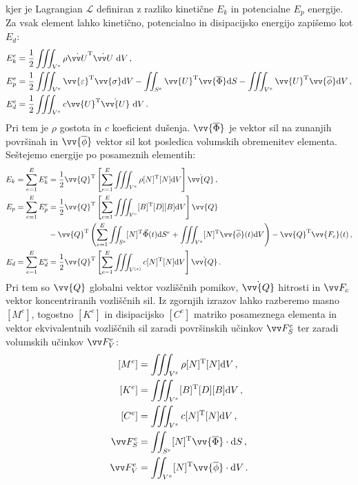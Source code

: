         kjer je Lagrangian $\mathcal{L}$ definiran z razliko kinetične $E_k$ in potencialne $E_p$ energije. Za vsak element lahko kinetično, potencialno in disipacijsko energijo zapišemo kot $E_d$:
        \begin{align}
            E_k^e&=\frac{1}{2} \iiint_{V^e} \rho \dot{\vv U}^{\text{T}} \dot{\vv U} \mathrm{~d} V \,,\\
            E_p^e&=\frac{1}{2} \iiint_{V^e} \vv{\varepsilon}^{\text{T}} \vv{\sigma} \mathrm{d} V-\iint_{S^{e}} \vv{U}^{\text{T}} \vv{\overline{\Phi}} \mathrm{d} S -\iiint_{V^e} \vv{U}^{\text{T}} \vv{\overline{\phi}} \mathrm{d} V \,,\\
            E_d^e&=\frac{1}{2} \iiint_{V^{e}} c \vv{U}^{\text{T}} \dot{\vv{U}} \mathrm{~d} V \, . 
        \end{align}
        Pri tem je $\rho$ gostota in $c$ koeficient dušenja. $\vv{\overline{\Phi}}$ je vektor sil na zunanjih površinah in $ \vv{\overline{\phi}}$ vektor sil kot posledica volumskih obremenitev  elementa. 
        Seštejemo energije po posameznih elementih:
        \begin{align}
            E_k=\sum_{e=1}^{E} E_k^{e}&=\frac{1}{2} \vv{Q}^{\text{T}}\left[\sum_{e=1}^{E} \iiint_{V^e} \rho[N]^{\text{T}}[N] \mathrm{d} V\right] \dot{\vv{Q}} \,,\\
            E_p=\sum_{e=1}^{E} E_p^{e}&=\frac{1}{2} \vv{Q}^{\text{T}}\left[\sum_{e=1}^{E} \iiint_{V^e}[B]^{\text{T}}[D][B] \mathrm{d} V\right] \vv{Q} \nonumber \\ 
            &-\vv{Q}^{\text{T}}\left(\sum_{e=1}^{E} \iint_{S^{e}}[N]^{\text{T}} \vec{\Phi}(t) \mathrm{d} S^e+\iiint_{V^e}[N]^{\text{T}} \vv{\overline{\phi}}(t) \mathrm{d} V\right)-\vv{Q}^{\text{T}} \vv{F_c}(t) \,,\\
            E_d=\sum_{e=1}^{E} E_d^{e}&=\frac{1}{2} \vv{Q}^{\text{T}}\left[\sum_{e=1}^{E} \iiint_{V^{(e)}} c[N]^{\text{T}}[N] \mathrm{d} V\right] \dot{\vv{Q}} \,.
        \end{align}
        Pri tem so $\vv{Q}$ globalni vektor vozliščnih pomikov, $\dot{\vv{Q}}$ hitrosti in $\vv F_c$ vektor koncentriranih vozliščnih sil. Iz zgornjih izrazov lahko razberemo masno $[M^e]$, togostno $[K^e]$ in disipacijsko $[C^e]$ matriko posameznega elementa in vektor ekvivalentnih vozliščnih sil zaradi površinskih učinkov $ \vv F_S^e$ ter zaradi volumskih učinkov $ \vv F_V^e$:
        \begin{align}
            \left[M^{e}\right]&=\iiint_{V^e} \rho[N]^{\text{T}}[N] \mathrm{d} V \label{eq:M_matrika} \,, \\
            \left[K^{e}\right]&=\iiint_{V^e} [B]^{\text{T}}[D][B] \mathrm{d} V \label{eq:K_matrika} \,, \\
            \left[C^{e}\right]&=\iiint_{V^e} c[N]^{\text{T}}[N] \mathrm{d} V \,, \\
            \vv F_S^e&=\iint_{S^{e}}[N]^{\text{T}} \vv{\overline{\Phi}} \cdot \mathrm{d} S \,, \\
            \vv F_V^e&=\iint_{V^{e}}[N]^{\text{T}} \vv{\overline{\phi}} \cdot \mathrm{d} V \,.
        \end{align}
